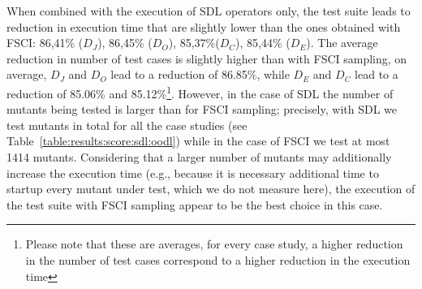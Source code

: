 When combined with the execution of SDL operators only, the \APPR test suite leads to reduction in execution time that are slightly lower than the ones obtained with FSCI: 86,41\% ($D_J$), 86,45\% ($D_O$), 85,37\%($D_C$), 85,44\% ($D_E$). The average reduction in number of test cases is slightly higher than with FSCI sampling, on average, $D_J$ and $D_O$ lead to a reduction of 86.85\%, while $D_E$ and $D_C$ lead to a reduction of 85.06\% and 85.12\%\footnote{Please note that these are averages, for every case study, a higher reduction in the number of test cases correspond to a higher reduction in the execution time}. However, in the case of SDL the number of mutants being tested is larger than for FSCI sampling; precisely, with SDL we test  mutants in total for all the case studies (see Table~\ref{table:results:score:sdl:oodl}) while in the case of FSCI we test at most 1414 mutants. Considering that a larger number of mutants may additionally increase the execution time (e.g., because it is necessary additional time to startup every mutant under test, which we do not measure here), the execution of the \APPR test suite with FSCI sampling appear to be the best choice in this case.




